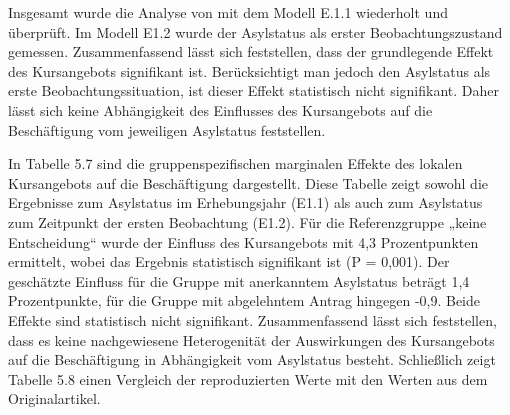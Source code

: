 Insgesamt wurde die Analyse von \textcite{Kanas:2023} mit dem Modell E.1.1 wiederholt und überprüft. Im Modell E1.2 wurde der Asylstatus als erster Beobachtungszustand gemessen. Zusammenfassend lässt sich feststellen, dass der grundlegende Effekt des Kursangebots signifikant ist. Berücksichtigt man jedoch den Asylstatus als erste Beobachtungssituation, ist dieser Effekt statistisch nicht signifikant. Daher lässt sich keine Abhängigkeit des Einflusses des Kursangebots auf die Beschäftigung vom jeweiligen Asylstatus feststellen.



In Tabelle 5.7 sind die gruppenspezifischen marginalen Effekte des lokalen Kursangebots auf die Beschäftigung dargestellt. Diese Tabelle zeigt sowohl die Ergebnisse zum Asylstatus im Erhebungsjahr (E1.1) als auch zum Asylstatus zum Zeitpunkt der ersten Beobachtung (E1.2). Für die Referenzgruppe „keine Entscheidung“ wurde der Einfluss des Kursangebots mit 4,3 Prozentpunkten ermittelt, wobei das Ergebnis statistisch signifikant ist (P = 0,001). Der geschätzte Einfluss für die Gruppe mit anerkanntem Asylstatus beträgt 1,4 Prozentpunkte, für die Gruppe mit abgelehntem Antrag hingegen -0,9. Beide Effekte sind statistisch nicht signifikant. Zusammenfassend lässt sich feststellen, dass es keine nachgewiesene Heterogenität der Auswirkungen des Kursangebots auf die Beschäftigung in Abhängigkeit vom Asylstatus besteht. Schließlich zeigt Tabelle 5.8 einen Vergleich der reproduzierten Werte mit den Werten aus dem Originalartikel.



